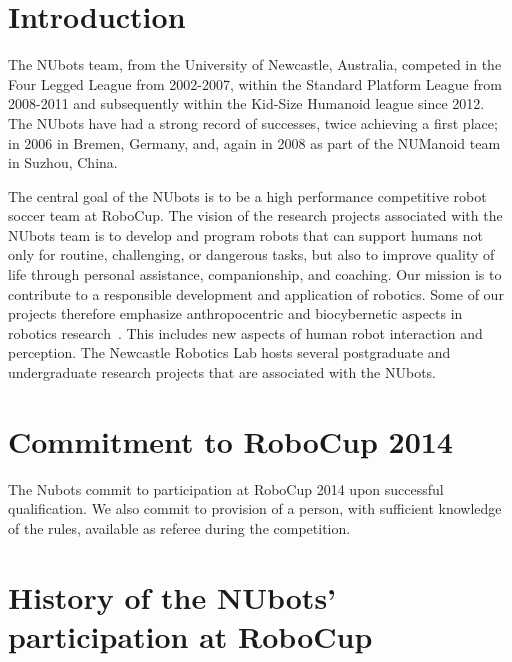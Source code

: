 \documentclass{llncs}
\begin{document}
%
\section{Introduction}
%
The NUbots team, from the University of Newcastle, Australia, competed in the Four Legged League from 2002-2007, within the Standard Platform League from 2008-2011 and subsequently within the Kid-Size Humanoid league since 2012. The NUbots have had a strong record of successes, twice achieving a first place; in 2006 in Bremen, Germany, and, again in 2008 as part of the NUManoid team in Suzhou, China.

The central goal of the NUbots is to be a high performance competitive robot soccer team at RoboCup. The vision of the research projects associated with the NUbots team is to develop and program robots that can support humans not only for routine, challenging, or dangerous tasks, but also to improve quality of life through personal assistance, companionship, and coaching.  Our mission is to contribute to a responsible development and application of robotics. Some of our projects therefore emphasize anthropocentric and biocybernetic
aspects in robotics research~\cite{ChalupOstwald2009}. This includes new aspects of human robot interaction and perception. The Newcastle Robotics Lab hosts several postgraduate and undergraduate research projects that are associated with the NUbots.


\section{Commitment to RoboCup 2014}
The Nubots commit to participation at RoboCup 2014 upon successful qualification. We also commit to provision of a person, with sufficient knowledge of the rules, available as referee during the competition.

\section{History of the NUbots' participation at RoboCup}
\end{document}
